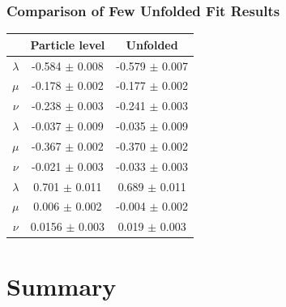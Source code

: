 \documentclass[12pt, xcolor={dvipsnames}, aspectratio = 169, sans, mathserif]{beamer}
\begin{document}
\begin{frame}
\frametitle{Comparison of Few Unfolded Fit Results}

\begin{center}
\begin{tabular}{|c  c  c|}
\hline
 & Particle level & Unfolded \\
\hline
$\lambda$ & -0.584 $\pm$ 0.008 & -0.579 $\pm$ 0.007 \\
$\mu$ & -0.178 $\pm$ 0.002 & -0.177 $\pm$ 0.002 \\
$\nu$ & -0.238 $\pm$ 0.003 & -0.241 $\pm$ 0.003 \\
\hline
$\lambda$ & -0.037 $\pm$ 0.009 & -0.035 $\pm$ 0.009 \\
$\mu$ & -0.367 $\pm$ 0.002 & -0.370 $\pm$ 0.002 \\
$\nu$ & -0.021 $\pm$ 0.003 & -0.033 $\pm$ 0.003 \\
\hline
$\lambda$ & 0.701 $\pm$ 0.011 & 0.689 $\pm$ 0.011 \\
$\mu$ & 0.006 $\pm$ 0.002 & -0.004 $\pm$ 0.002 \\
$\nu$ & 0.0156 $\pm$ 0.003 & 0.019 $\pm$ 0.003 \\
\hline
\end{tabular}
\end{center}
\end{frame}

\section{Summary}
\end{document}
